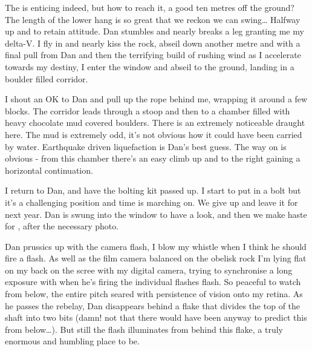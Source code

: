The  is enticing indeed, but how to reach it, a good
ten metres off the ground? The length of the lower hang is so great that
we reckon we can swing\ldots{} Halfway up and  to retain attitude. Dan stumbles and nearly breaks a leg granting
me my delta-V. I fly in and nearly kiss the rock, abseil down another
metre and with a final pull from Dan and then the terrifying build of
rushing wind as I accelerate towards my destiny, I enter the window and
abseil to the ground, landing in a boulder filled corridor.

I shout an OK to Dan and pull up the rope behind me, wrapping it around a
few blocks. The corridor leads through a stoop and then to a chamber
filled with heavy chocolate mud covered boulders. There is an extremely
noticeable draught here. The mud is extremely odd, it's not obvious how
it could have been carried by water. Earthquake driven liquefaction is
Dan's best guess. The way on is obvious - from this chamber there's an
easy climb up and to the right gaining a horizontal continuation.

I return to Dan, and have the bolting kit passed up. I start to put in a
bolt but it's a challenging position and time is marching on. We give up
and leave it for next year. Dan is swung into the window to have a look,
and then we make haste for , after the necessary photo.




Dan prussics up with the camera flash, I blow my whistle when I think he
should fire a flash. As well as the film camera balanced on the obelisk
rock I'm lying flat on my back on the scree with my digital camera,
trying to synchronise a long exposure with when he's firing the
individual flashes flash. So peaceful to watch from below, the entire
pitch seared with persistence of vision onto my retina. As he passes the
rebelay, Dan disappears behind a flake that divides the top of the shaft
into two bits (damn! not that there would have been anyway to predict
this from below\ldots{}). But still the flash illuminates from behind
this flake, a truly enormous and humbling place to be.

